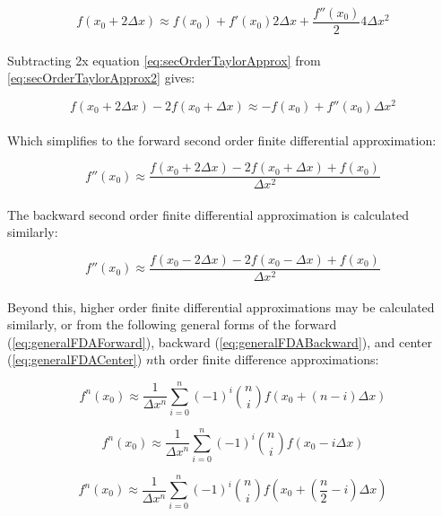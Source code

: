 {  \begin{equation}\label{eq:secOrderTaylorApprox2}
  f(x_{0} + 2\Delta  x) \approx f(x_{0}) + f'(x_{0})2\Delta  x + \frac{f''(x_{0})}{2}4\Delta  x^{2}
  \end{equation}
    \\
  Subtracting 2x equation \ref{eq:secOrderTaylorApprox} from \ref{eq:secOrderTaylorApprox2} gives:
  
    \begin{equation}
  f(x_{0} + 2\Delta  x) - 2f(x_{0} + \Delta  x) \approx -f(x_{0}) + f''(x_{0})\Delta  x^{2}
  \end{equation}
  \\
Which simplifies to the forward second order finite differential approximation:
  
      \begin{equation}
f''(x_{0}) \approx \frac{f(x_{0} + 2\Delta  x) - 2f(x_{0} + \Delta  x) + f(x_{0})}{\Delta  x^{2}}
  \end{equation}
  \\
  The backward second order finite differential approximation is calculated similarly:
  
        \begin{equation}
f''(x_{0}) \approx \frac{f(x_{0} - 2\Delta  x) - 2f(x_{0} - \Delta  x) + f(x_{0})}{\Delta  x^{2}}
  \end{equation}
  \\
 Beyond this, higher order finite differential approximations may be calculated similarly, or from the following general forms of the forward (\ref{eq:generalFDAForward}), backward (\ref{eq:generalFDABackward}), and center (\ref{eq:generalFDACenter}) $n$th order finite difference approximations:
 
  \begin{equation}\label{eq:generalFDAForward}
 f^{n}(x_{0}) \approx \frac{1}{\Delta  x^{n}}\sum_{i=0}^{n}(-1)^{i}\binom {n} {i}f(x_{0} + (n-i)\Delta  x)
 \end{equation}
 
 \begin{equation}\label{eq:generalFDABackward}
 f^{n}(x_{0}) \approx \frac{1}{\Delta  x^{n}}\sum_{i=0}^{n}(-1)^{i}\binom {n} {i}f(x_{0} - i\Delta  x)
 \end{equation}
 
  \begin{equation}\label{eq:generalFDACenter}
 f^{n}(x_{0}) \approx \frac{1}{\Delta  x^{n}}\sum_{i=0}^{n}(-1)^{i}\binom {n} {i}f(x_{0} + \left(\frac{n}{2}-i\right)\Delta  x)
 \end{equation}
 
}
